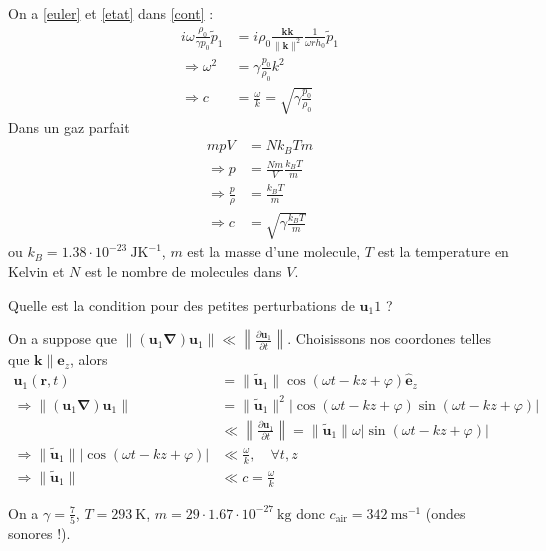On a \ref{euler} et \ref{etat} dans \ref{cont} :
\begin{align*}
i\omega    \frac{\rho_{0}}{\gamma p_{0}}\tilde{p}_{1} & =i\rho_{0}  \frac{\boldsymbol{kk}}{\lVert \boldsymbol{k} \rVert ^{2}} \frac{1}{\omega rh_{0}}\tilde{p}_{1} \\
 \Rightarrow \omega^{2} & =\gamma    \frac{p_{0}}{\rho_{0} } k^{2} \\
\Rightarrow c  & =\frac{\omega}{k}=\sqrt{ \gamma  \frac{p_{0}}{\rho_{0}} }
\end{align*}
Dans un gaz parfait
\begin{align*}
mpV & =Nk_{B}Tm \\
 \Rightarrow p & = \frac{Nm}{V} \frac{k_{B}T}{m} \\
 \Rightarrow \frac{p}{\rho} & =\frac{k_{B}T}{m} \\
\Rightarrow c & =\sqrt{ \gamma  \frac{k_{B}T}{m} }
\end{align*}
ou $k_{B}=1.38\cdot 10^{-23}~\mathrm{JK}^{-1}$, $m$ est la masse d'une molecule, $T$ est la temperature en Kelvin et $N$ est le nombre de molecules dans $V$.

\begin{question}
Quelle est la condition pour des petites perturbations de $\boldsymbol{u}_{1}1$ ? 
\end{question}
\begin{answer}
On a suppose que $\lVert (\boldsymbol{u}_{1}\boldsymbol{\nabla})\boldsymbol{u}_{1} \rVert \ll \left\lVert  \frac{ \partial \boldsymbol{u}_{1} }{ \partial t }  \right\rVert$. Choisissons nos coordones telles que $\boldsymbol{k} \parallel \boldsymbol{\hat{e}}_{z}$, alors 
\begin{align*}
\boldsymbol{u}_{1}(\boldsymbol{r},t) & =\lVert \tilde{\boldsymbol{u}}_{1} \rVert \cos(\omega t-kz+\varphi )\boldsymbol{\hat{e}}_{z} \\
 \Rightarrow \lVert (\boldsymbol{u}_{1}\boldsymbol{\nabla})\boldsymbol{u}_{1} \rVert  & =\lVert \tilde{\boldsymbol{u}}_{1} \rVert ^{2}\lvert \cos(\omega t-kz+\varphi)\sin(\omega t-kz+\varphi) \rvert \\
 & \ll \left\lVert  \frac{ \partial \boldsymbol{u}_{1} }{ \partial t }   \right\rVert =\lVert \tilde{\boldsymbol{u}}_{1} \rVert \omega \lvert \sin(\omega t-kz+\varphi) \rvert   \\
\Rightarrow \lVert \tilde{\boldsymbol{u}}_{1} \rVert \lvert \cos(\omega t-kz+\varphi) \rvert   & \ll \frac{\omega}{k},\quad \forall t,z \\
\Rightarrow \lVert \tilde{\boldsymbol{u}}_{1} \rVert  & \ll c=\frac{\omega}{k}
\end{align*}
\end{answer}

\begin{example}
	On a $\gamma=\frac{7}{5}$, $T=293~\mathrm{K}$, $m=29\cdot 1.67\cdot 10^{-27}~\mathrm{kg}$ donc $c_{\mathrm{air}}=342 ~\mathrm{ms}^{-1}$ (ondes sonores !).
\end{example}